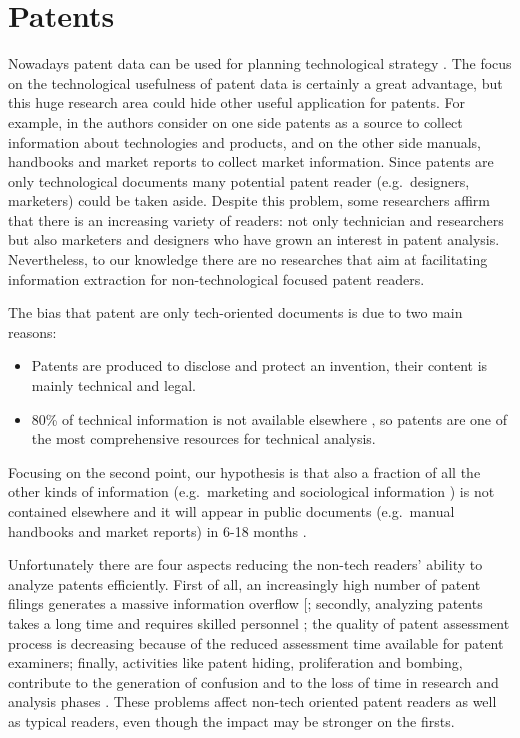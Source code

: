 \documentclass[]{book}
\providecommand{\tightlist}{%
  \setlength{\itemsep}{0pt}\setlength{\parskip}{0pt}}
\theoremstyle{definition}
\theoremstyle{definition}
\theoremstyle{definition}
\theoremstyle{remark}
\begin{document}
\section{Patents}\label{sotadocumentspatents}

Nowadays patent data can be used for planning technological strategy
\citep{ernst2003patent}. The focus on the technological usefulness of
patent data is certainly a great advantage, but this huge research area
could hide other useful application for patents. For example, in
\citep{jin2015technology} the authors consider on one side patents as a
source to collect information about technologies and products, and on
the other side manuals, handbooks and market reports to collect market
information. Since patents are only technological documents many
potential patent reader (e.g.~designers, marketers) could be taken
aside. Despite this problem, some researchers \citep{bonino2010review}
affirm that there is an increasing variety of readers: not only
technician and researchers but also marketers and designers who have
grown an interest in patent analysis. Nevertheless, to our knowledge
there are no researches that aim at facilitating information extraction
for non-technological focused patent readers.

The bias that patent are only tech-oriented documents is due to two main
reasons:

\begin{itemize}
\tightlist
\item
  Patents are produced to disclose and protect an invention, their
  content is mainly technical and legal.
\item
  80\% of technical information is not available elsewhere
  \citep{terragno1979}, so patents are one of the most comprehensive
  resources for technical analysis.
\end{itemize}

Focusing on the second point, our hypothesis is that also a fraction of
all the other kinds of information (e.g.~marketing and sociological
information ) is not contained elsewhere and it will appear in public
documents (e.g.~manual handbooks and market reports) in 6-18 months
\citep{golzio2012}.

Unfortunately there are four aspects reducing the non-tech readers'
ability to analyze patents efficiently. First of all, an increasingly
high number of patent filings generates a massive information overflow
{[}\citet{bergmann2008evaluating}; secondly, analyzing patents takes a
long time and requires skilled personnel \citep{liang2007text}; the
quality of patent assessment process is decreasing
\citep{burke2007, philipp2006} because of the reduced assessment time
available for patent examiners; finally, activities like patent hiding,
proliferation and bombing, contribute to the generation of confusion and
to the loss of time in research and analysis phases
\citep{fantoni2013automatic}. These problems affect non-tech oriented
patent readers as well as typical readers, even though the impact may be
stronger on the firsts.
\end{document}
